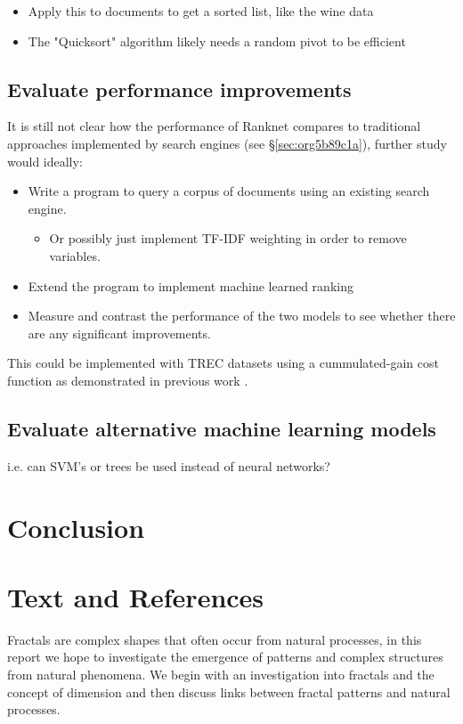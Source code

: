 \documentclass[a4paper,11pt,twoside]{article}
\begin{document}
\begin{itemize}
\item Apply this to documents to get a sorted list, like the wine data
\item The "Quicksort" algorithm likely needs a random pivot to be efficient \cite{timroughgardenQuicksortOverview2017}
\end{itemize}

\subsection{Evaluate performance improvements}
\label{sec:orgbbe4027}

It is still not clear how the
performance of Ranknet compares to traditional approaches
implemented by search engines (see \S \ref{sec:org5b89c1a}), further
study would ideally:

\begin{itemize}
\item Write a program to query a corpus of documents using an existing search engine.
\begin{itemize}
\item Or possibly just implement TF-IDF weighting in order to remove variables.
\end{itemize}
\item Extend the program to implement machine learned ranking
\item Measure and contrast the performance of the two models to see
whether there are any significant improvements.
\end{itemize}

This could be implemented with TREC datasets
\cite{usnationalinstituteofstandardsandtechnologyTextREtrievalConference}
using a cummulated-gain cost function
\cite{jarvelinCumulatedGainbasedEvaluation2002} as demonstrated in
previous work \cite{viksinghComparisonOpenSource2009}.

\subsection{Evaluate alternative machine learning models}
\label{sec:org5704ce3}
i.e. can SVM's or trees be used instead of neural networks?

\section{Conclusion}
\label{sec:org5403215}

\section{Text and References}
\label{sec:org1ca4880}
Fractals are complex shapes that often occur from natural processes, in this
report we hope to investigate the emergence of patterns and complex structures
from natural phenomena. We begin with an investigation into fractals and the
concept of dimension and then discuss links between fractal patterns and natural
processes.
\end{document}
